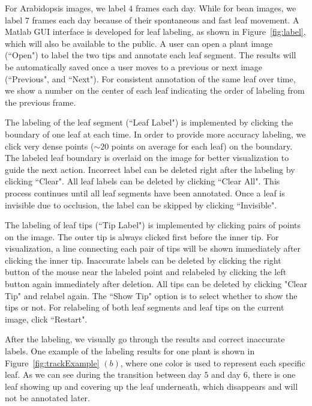 For Arabidopsis images, we label $4$ frames each day.
While for bean images, we label $7$ frames each day because of their spontaneous and fast leaf movement.
A Matlab GUI interface is developed for leaf labeling, as shown in Figure~\ref{fig:label}, which will also be available to the public.
A user can open a plant image (``Open") to label the two tips and annotate each leaf segment.
The results will be automatically saved once a user moves to a previous or next image (``Previous", and ``Next").
For consistent annotation of the same leaf over time, we show a number on the center of each leaf indicating the order of labeling from the previous frame.

The labeling of the leaf segment (``Leaf Label") is implemented by clicking the boundary of one leaf at each time.
In order to provide more accuracy labeling, we click very dense points ($\sim20$ points on average for each leaf) on the boundary.
The labeled leaf boundary is overlaid on the image for better visualization to guide the next action.
Incorrect label can be deleted right after the labeling by clicking ``Clear".
All leaf labels can be deleted by clicking ``Clear All".
This process continues until all leaf segments have been annotated.
Once a leaf is invisible due to occlusion, the label can be skipped by clicking ``Invisible".

The labeling of leaf tips (``Tip Label") is implemented by clicking pairs of points on the image.
The outer tip is always clicked first before the inner tip.
For visualization, a line connecting each pair of tips will be shown immediately after clicking the inner tip.
Inaccurate labels can be deleted by clicking the right button of the mouse near the labeled point and relabeled by clicking the left button again immediately after deletion.
All tips can be deleted by clicking "Clear Tip" and relabel again.
The ``Show Tip" option is to select whether to show the tips or not. 
For relabeling of both leaf segments and leaf tips on the current image, click ``Restart". 

After the labeling, we visually go through the results and correct inaccurate labels.
One example of the labeling results for one plant is shown in Figure~\ref{fig:trackExample} $(b)$, where one color is used to represent each specific leaf.
As we can see during the transition between day $5$ and day $6$, there is one leaf showing up and covering up the leaf underneath, which disappears and will not be annotated later.

